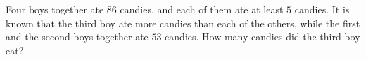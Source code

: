 Four boys together ate $86$ candies, and each of them ate at least $5$ candies. It is known that the third boy ate more candies than each of the others, while the first and the second boys together ate $53$ candies. How many candies did the third boy eat?
